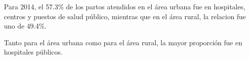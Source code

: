 Para 2014, el 57.3\% de los partos atendidos en el área urbana fue en hospitales, centros y puestos de salud público, mientras que en el área rural, la relacion fue uno de 49.4\%.

 Tanto para el área urbana como para el área rural, la mayor proporción fue en hospitales públicos.